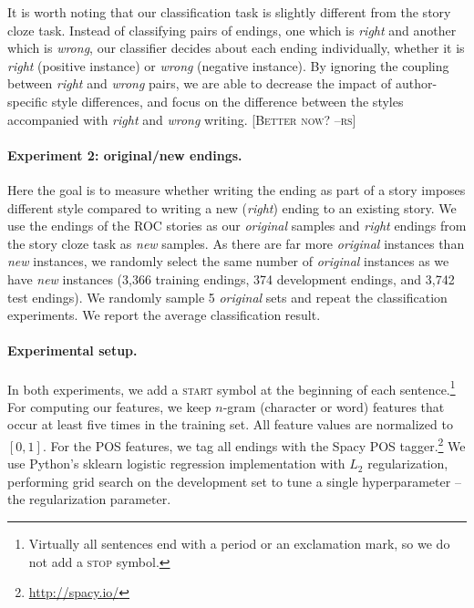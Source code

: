 \documentclass[11pt,a4paper]{article}
\newcommand{\resolved}[1]{}
\newcommand{\roy}[1]{{\color{orange}\textsc{[#1 --rs]}}}
\newcommand{\nascomment}[1]{{\color{blue}\textsc{[#1 --nas]}}}
\begin{document}
It is worth noting that our classification task is slightly different from the story cloze task. 
Instead of classifying pairs of endings, one which is {\it right} and
another which is {\it wrong}, our classifier decides about each ending
individually, whether it is \emph{right} (positive instance) or
\emph{wrong} (negative instance).
By ignoring the coupling between {\it right} and {\it wrong} pairs, 
we are able to decrease the impact of author-specific style differences,
and focus on the difference between the styles accompanied with {\it right} and {\it wrong} writing.
\resolved{we
are able make a more general claim about the style used when writing
each of the tasks \nascomment{I'm not sure I follow this sentence; can
we be more clear?}.}\roy{Better now?}

\paragraph{Experiment 2: original/new endings.}

Here the goal is to measure whether writing the ending as part of a
story imposes different style compared to writing a new ({\it right}) ending to an existing story.
We use the endings of the ROC stories as our {\it original} samples and {\it right} endings from the story cloze task   \resolved{\nascomment{if you're using the test examples as
  training data, what are you using for test? and development?  I would have thought
  you'd follow the same pattern as above ... }}as {\it new} samples.
As there are far more {\it original} instances than {\it new}
instances, we randomly select the same number of \emph{original}
instances  \resolved{\nascomment{(give the number in parentheses, for train/dev/test)} }as we have
\emph{new} instances (3,366 training endings, 374 development endings, and 3,742 test endings).
We randomly sample 5 {\it original} sets and repeat the classification experiments.
We report the average classification result.

\paragraph{Experimental setup.}
In both experiments, we add a \textsc{start} symbol at the beginning
of each sentence.\footnote{Virtually all sentences end with a period
  or an exclamation mark, so we do not add a \textsc{stop} symbol.}
For computing our features, we keep $n$-gram (character or word) features that occur at least five times in the training set.
All feature values are normalized to $[0, 1]$.
For the POS features, we tag all endings with the Spacy POS tagger.\footnote{\url{http://spacy.io/}}
We use  Python's sklearn logistic regression implementation with $L_2$
regularization, performing grid search on the development set to
tune a single hyperparameter -- the regularization parameter.   \resolved{\nascomment{any other hyperparameters?  if
  not, say this is the only one.  else explain what they are.}}
\end{document}
